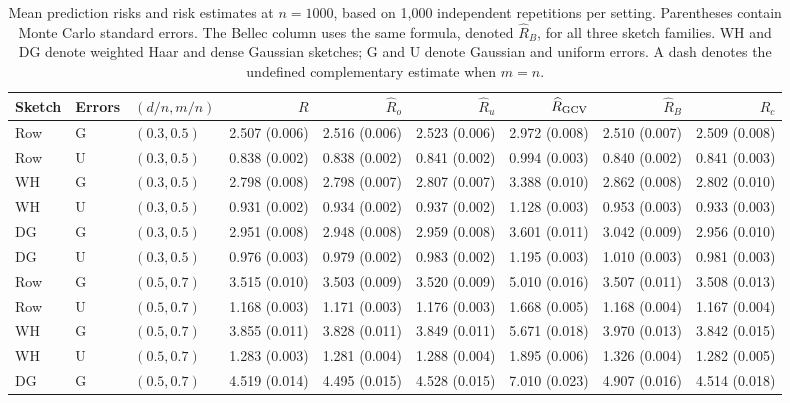 \documentclass{article}
\theoremstyle{plain}
\theoremstyle{definition}
\theoremstyle{definition}
\begin{document}
\begin{table}[p]
    \centering
    \fontsize{7.5}{9.5}\selectfont
    \setlength{\tabcolsep}{2pt}
    \caption{Mean prediction risks and risk estimates at $n=1000$,
    based on 1,000 independent repetitions per setting. Parentheses
    contain Monte Carlo standard errors. The Bellec column uses the same
    formula, denoted $\widehat R_B$, for all three sketch families.
    WH and DG denote weighted Haar and dense Gaussian sketches;
    G and U denote Gaussian and uniform errors.
    A dash denotes the undefined complementary estimate when $m=n$.}
    \label{tab:simulation-noninterpolating}
\begin{tabular}{@{}lllrrrrrr@{}}
\toprule
Sketch & Errors & $(d/n,m/n)$ & $R$ & $\widehat R_o$ & $\widehat R_u$ & $\widehat R_{\rm GCV}$ & $\widehat R_B$ & $\widehat R_c$ \\
\midrule
Row & G & $(0.3,0.5)$ & 2.507 (0.006) & 2.516 (0.006) & 2.523 (0.006) & 2.972 (0.008) & 2.510 (0.007) & 2.509 (0.008) \\
Row & U & $(0.3,0.5)$ & 0.838 (0.002) & 0.838 (0.002) & 0.841 (0.002) & 0.994 (0.003) & 0.840 (0.002) & 0.841 (0.003) \\
WH & G & $(0.3,0.5)$ & 2.798 (0.008) & 2.798 (0.007) & 2.807 (0.007) & 3.388 (0.010) & 2.862 (0.008) & 2.802 (0.010) \\
WH & U & $(0.3,0.5)$ & 0.931 (0.002) & 0.934 (0.002) & 0.937 (0.002) & 1.128 (0.003) & 0.953 (0.003) & 0.933 (0.003) \\
DG & G & $(0.3,0.5)$ & 2.951 (0.008) & 2.948 (0.008) & 2.959 (0.008) & 3.601 (0.011) & 3.042 (0.009) & 2.956 (0.010) \\
DG & U & $(0.3,0.5)$ & 0.976 (0.003) & 0.979 (0.002) & 0.983 (0.002) & 1.195 (0.003) & 1.010 (0.003) & 0.981 (0.003) \\
\midrule
Row & G & $(0.5,0.7)$ & 3.515 (0.010) & 3.503 (0.009) & 3.520 (0.009) & 5.010 (0.016) & 3.507 (0.011) & 3.508 (0.013) \\
Row & U & $(0.5,0.7)$ & 1.168 (0.003) & 1.171 (0.003) & 1.176 (0.003) & 1.668 (0.005) & 1.168 (0.004) & 1.167 (0.004) \\
WH & G & $(0.5,0.7)$ & 3.855 (0.011) & 3.828 (0.011) & 3.849 (0.011) & 5.671 (0.018) & 3.970 (0.013) & 3.842 (0.015) \\
WH & U & $(0.5,0.7)$ & 1.283 (0.003) & 1.281 (0.004) & 1.288 (0.004) & 1.895 (0.006) & 1.326 (0.004) & 1.282 (0.005) \\
DG & G & $(0.5,0.7)$ & 4.519 (0.014) & 4.495 (0.015) & 4.528 (0.015) & 7.010 (0.023) & 4.907 (0.016) & 4.514 (0.018) \\

\end{tabular}
\end{table}
\end{document}
